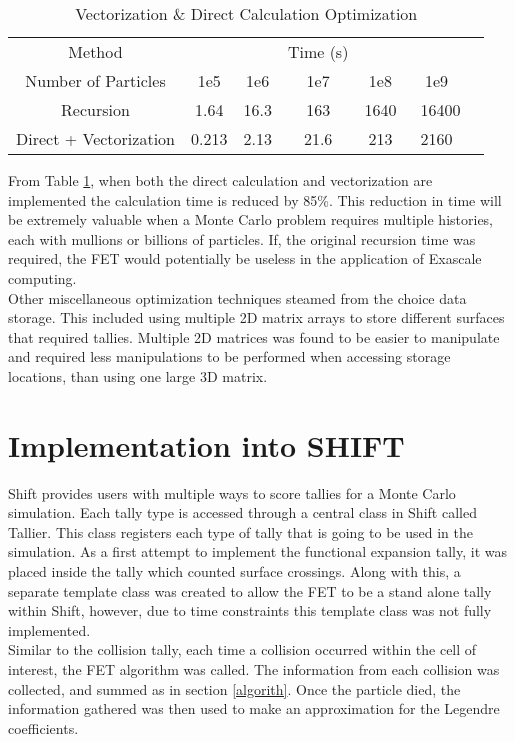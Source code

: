 \documentclass[10tma4paper]{article}
\begin{document}
\begin{table}[htbp!]
	\caption{Vectorization \& Direct Calculation Optimization}
	\centering
	\begin{tabular}{c c c c c c c }
		\hline
		Method & & & Time (s) & & & \\[0.5ex]
		Number of Particles& 1e5 & 1e6 & 1e7 & 1e8 & 1e9 &\\
		\hline		
		\hline
		Recursion & 1.64 & 16.3 & 163 & 1640 & ~16400 & \\
		Direct + Vectorization & 0.213 & 2.13 & 21.6 & 213 & 2160 & \\[1ex]
		\hline
	\end{tabular}
	\label{table:vect op}
\end{table}
From Table \ref{table:vect op}, when both the direct calculation and vectorization are implemented the calculation time is reduced by 85\%. This reduction in time will be extremely valuable when a Monte Carlo problem requires multiple histories, each with mullions or billions of particles. If, the original recursion time was required, the FET would potentially be useless in the application of Exascale computing.
\\
Other miscellaneous optimization techniques steamed from the choice data storage. This included using multiple 2D matrix arrays to store different surfaces that required tallies. Multiple 2D matrices was found to be easier to manipulate and required less manipulations to be performed when accessing storage locations, than using one large 3D matrix. 

\section{Implementation into SHIFT}\label{shift}
Shift provides users with multiple ways to score tallies for a Monte Carlo simulation. Each tally type is accessed through a central class in Shift called Tallier. This class registers each type of tally that is going to be used in the simulation. As a first attempt to implement the functional expansion tally, it was placed inside the tally which counted surface crossings. Along with this, a separate template class was created to allow the FET to be a stand alone tally within Shift, however, due to time constraints this template class was not fully implemented.
\\
Similar to the collision tally, each time a collision occurred within the cell of interest, the FET algorithm was called. The information from each collision was collected, and summed as in section \ref{algorith}. Once the particle died, the information gathered was then used to make an approximation for the Legendre coefficients.
\end{document}
